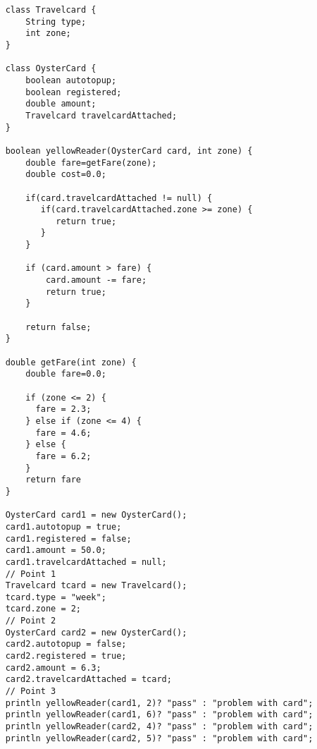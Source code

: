 \documentclass{article}
\begin{document}
\begin{verbatim}
    class Travelcard {
        String type;
        int zone;
    }
    
    class OysterCard {
        boolean autotopup;
        boolean registered;
        double amount;
        Travelcard travelcardAttached;
    }
    
    boolean yellowReader(OysterCard card, int zone) {
        double fare=getFare(zone);
        double cost=0.0;
      
        if(card.travelcardAttached != null) {
           if(card.travelcardAttached.zone >= zone) {
              return true;
           }
        }
      
        if (card.amount > fare) {
            card.amount -= fare;
            return true;
        }
   
        return false;
    }
                  
    double getFare(int zone) {
        double fare=0.0;
      
        if (zone <= 2) {
          fare = 2.3;
        } else if (zone <= 4) {
          fare = 4.6;
        } else {
          fare = 6.2;
        }         
        return fare
    }
    
    OysterCard card1 = new OysterCard();
    card1.autotopup = true;
    card1.registered = false;
    card1.amount = 50.0;
    card1.travelcardAttached = null;
    // Point 1
    Travelcard tcard = new Travelcard();
    tcard.type = "week";
    tcard.zone = 2;
    // Point 2
    OysterCard card2 = new OysterCard();
    card2.autotopup = false;
    card2.registered = true;
    card2.amount = 6.3;
    card2.travelcardAttached = tcard;
    // Point 3
    println yellowReader(card1, 2)? "pass" : "problem with card";
    println yellowReader(card1, 6)? "pass" : "problem with card";
    println yellowReader(card2, 4)? "pass" : "problem with card";
    println yellowReader(card2, 5)? "pass" : "problem with card";
\end{verbatim}
\end{document}
